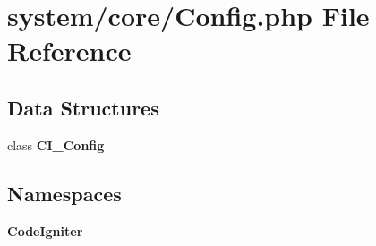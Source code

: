 \section{system/core/\-Config.php File Reference}
\label{system_2core_2config_8php}
\subsection*{Data Structures}
\begin{DoxyCompactItemize}
\item 
class {\bf C\-I\-\_\-\-Config}
\end{DoxyCompactItemize}
\subsection*{Namespaces}
\begin{DoxyCompactItemize}
\item 
{\bf Code\-Igniter}
\end{DoxyCompactItemize}
